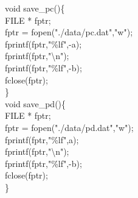 \documentclass{beamer}
\theoremstyle{remark}
\numberwithin{equation}{section}
\begin{document}
\begin{frame}
\vspace{20pt}
void save\_pc()\{\\
    FILE * fptr;\\
    fptr = fopen("./data/pc.dat","w");\\
    fprintf(fptr,"\%lf",-a);\\
    fprintf(fptr,"\textbackslash n");\\
    fprintf(fptr,"\%lf",-b);\\
    fclose(fptr);\\
\}\\
\vspace{12pt}
void save\_pd()\{\\
    FILE * fptr;\\
    fptr = fopen("./data/pd.dat","w");\\
    fprintf(fptr,"\%lf",a);\\
    fprintf(fptr,"\textbackslash n");\\
    fprintf(fptr,"\%lf",-b);\\
    fclose(fptr);\\
\}\\
\vspace{20pt}
\end{frame}
\end{document}
